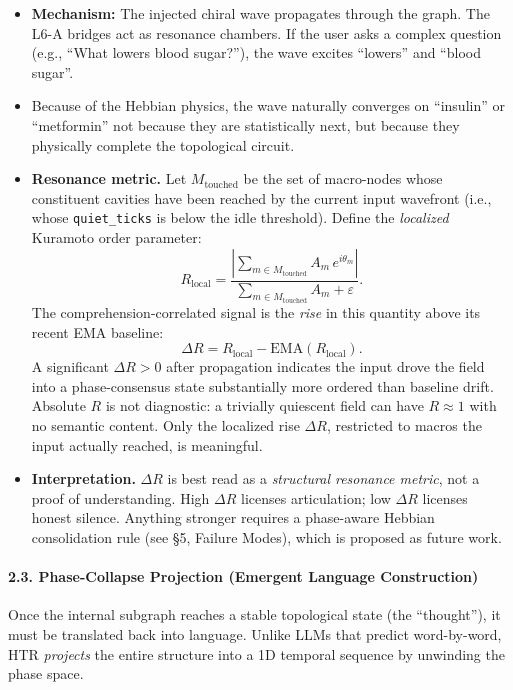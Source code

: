 \documentclass[
  11pt,
  a4paper,
]{article}
\providecommand{\tightlist}{%
  \setlength{\itemsep}{0pt}\setlength{\parskip}{0pt}}
\begin{document}
\begin{itemize}
\tightlist
\item
  \textbf{Mechanism:} The injected chiral wave propagates through the
  graph. The L6-A bridges act as resonance chambers. If the user asks a
  complex question (e.g., ``What lowers blood sugar?''), the wave
  excites ``lowers'' and ``blood sugar''.
\item
  Because of the Hebbian physics, the wave naturally converges on
  ``insulin'' or ``metformin'' not because they are statistically next,
  but because they physically complete the topological circuit.
\item
  \textbf{Resonance metric.} Let \(M_{\text{touched}}\) be the set of
  macro-nodes whose constituent cavities have been reached by the
  current input wavefront (i.e., whose \texttt{quiet\_ticks} is below
  the idle threshold). Define the \emph{localized} Kuramoto order
  parameter:
  \[ R_{\text{local}} = \frac{\left| \sum_{m \in M_{\text{touched}}} A_m \, e^{i\theta_m} \right|}{\sum_{m \in M_{\text{touched}}} A_m + \varepsilon}. \]
  The comprehension-correlated signal is the \emph{rise} in this
  quantity above its recent EMA baseline:
  \[ \Delta R = R_{\text{local}} - \text{EMA}(R_{\text{local}}). \] A
  significant \(\Delta R > 0\) after propagation indicates the input
  drove the field into a phase-consensus state substantially more
  ordered than baseline drift. Absolute \(R\) is not diagnostic: a
  trivially quiescent field can have \(R \approx 1\) with no semantic
  content. Only the localized rise \(\Delta R\), restricted to macros
  the input actually reached, is meaningful.
\item
  \textbf{Interpretation.} \(\Delta R\) is best read as a
  \emph{structural resonance metric}, not a proof of understanding. High
  \(\Delta R\) licenses articulation; low \(\Delta R\) licenses honest
  silence. Anything stronger requires a phase-aware Hebbian
  consolidation rule (see §5, Failure Modes), which is proposed as
  future work.
\end{itemize}

\paragraph{2.3. Phase-Collapse Projection (Emergent Language
Construction)}\label{phase-collapse-projection-emergent-language-construction}

Once the internal subgraph reaches a stable topological state (the
``thought''), it must be translated back into language. Unlike LLMs that
predict word-by-word, HTR \emph{projects} the entire structure into a 1D
temporal sequence by unwinding the phase space.
\end{document}
